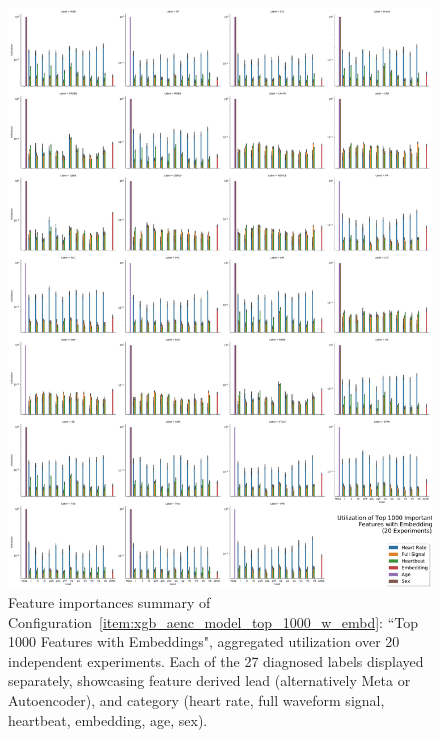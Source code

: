 \documentclass[\main/thesis.tex]{subfiles}
\begin{document}
\begin{figure}[t]
    \centering
    \includegraphics[width=\textwidth]{figure/utilization_top_1000_feature_importances_all_w_embedding.pdf}
    \caption{Feature importances summary of Configuration~\ref{item:xgb_aenc_model_top_1000_w_embd}: ``Top 1000 Features with Embeddings", aggregated utilization over 20 independent experiments. Each of the 27 diagnosed labels displayed separately, showcasing feature derived lead (alternatively Meta or Autoencoder), and category (heart rate, full waveform signal, heartbeat, embedding, age, sex).}
    \label{fig:xgb_aenc_top_1000_features_labelwise}
\end{figure}
\end{document}
